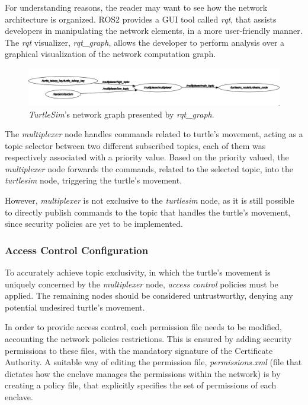 For understanding reasons, the reader may want to see how the network architecture is organized. ROS2 provides a GUI tool called \textit{rqt}, that assists developers in manipulating the network elements, in a more user-friendly manner. The \textit{rqt} visualizer, \textit{rqt\_graph}, allows the developer to perform analysis over a graphical visualization of the network computation graph.

\begin{figure}[H]
    \centering
    \includegraphics[width=0.8\linewidth]{images/ts_rqt_graph.png}
    \caption{\textit{TurtleSim}'s network graph presented by \textit{rqt\_graph}.}
    \label{fig:ts-rqt-graph}
\end{figure}

The \textit{multiplexer} node handles commands related to turtle's movement, acting as a topic selector between two different subscribed topics, each of them was respectively associated with a priority value. Based on the priority valued, the \textit{multiplexer} node forwards the commands, related to the selected topic, into the \textit{turtlesim} node, triggering the turtle's movement. 

However, \textit{multiplexer} is not exclusive to the \textit{turtlesim} node, as it is still possible to directly publish commands to the topic that handles the turtle's movement, since security policies are yet to be implemented.

\subsubsection{Access Control Configuration}

To accurately achieve topic exclusivity, in which the turtle's movement is uniquely concerned by the \textit{multiplexer} node, \textit{access control} policies must be applied. The remaining nodes should be considered untrustworthy, denying any potential undesired turtle's movement.
            
In order to provide access control, each permission file needs to be modified, accounting the network policies restrictions. This is ensured by adding security permissions to these files, with the mandatory signature of the Certificate Authority. A suitable way of editing the permission file, \textit{permissions.xml} (file that dictates how the enclave manages the permissions within the network) is by creating a policy file, that explicitly specifies the set of permissions of each enclave.

